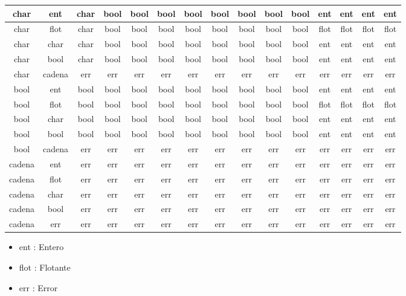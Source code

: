 \begin{table}
\begin{tabular}{||c c || c c c c c c c c c c c c c||}
         char & ent & char & bool & bool & bool & bool & bool & bool & bool & bool & ent & ent & ent & ent \\ 
         \hline
         char & flot & char & bool & bool & bool & bool & bool & bool & bool & bool & flot & flot & flot & flot \\ 
         \hline
         char & char & char & bool & bool & bool & bool & bool & bool & bool & bool & ent & ent & ent & ent \\ 
         \hline
         char & bool & char & bool & bool & bool & bool & bool & bool & bool & bool & ent & ent & ent & ent \\ 
         \hline
         char & cadena & err & err & err & err & err & err & err & err & err & err & err & err & err \\ 
         \hline
         bool & ent & bool & bool & bool & bool & bool & bool & bool & bool & bool & ent & ent & ent & ent \\ 
         \hline
         bool & flot & bool & bool & bool & bool & bool & bool & bool & bool & bool & flot & flot & flot & flot \\ 
         \hline
         bool & char & bool & bool & bool & bool & bool & bool & bool & bool & bool & ent & ent & ent & ent \\ 
         \hline
         bool & bool & bool & bool & bool & bool & bool & bool & bool & bool & bool & ent & ent & ent & ent \\ 
         \hline
         bool & cadena & err & err & err & err & err & err & err & err & err & err & err & err & err \\ 
         \hline
         cadena & ent & err & err & err & err & err & err & err & err & err & err & err & err & err \\ 
         \hline
         cadena & flot & err & err & err & err & err & err & err & err & err & err & err & err & err \\ 
         \hline
         cadena & char & err & err & err & err & err & err & err & err & err & err & err & err & err \\ 
         \hline
         cadena & bool & err & err & err & err & err & err & err & err & err & err & err & err & err \\ 
         \hline
         cadena & err & err & err & err & err & err & err & err & err & err & err & err & err & err \\ 
        
         
        
        \end{tabular}
        \begin{itemize}
            \item ent : Entero
            \item flot : Flotante
            \item err : Error
        \end{itemize}
    
\end{table}
\FloatBarrier

